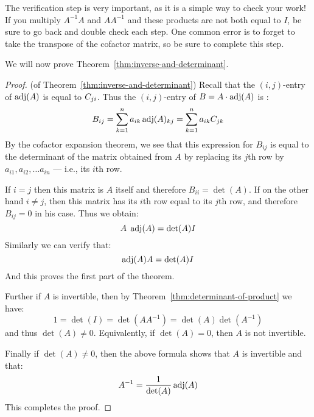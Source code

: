 The verification step is very important, as it is a simple way to
check your work! If you multiply $A^{-1}A$ and $AA^{-1}$ and these
products are not both equal to $I$, be sure to go back and double
check each step.  One common error is to forget to take the transpose
of the cofactor matrix, so be sure to complete this step.

We will now prove Theorem~\ref{thm:inverse-and-determinant}.

\begin{proof} (of Theorem~\ref{thm:inverse-and-determinant}) Recall
  that the $(i,j)$-entry of $\adj(A)$ is equal to $\cofactor{A}{ji}$.
  Thus the $(i,j)$-entry of $B=A\cdot \adj(A)$ is :
  \begin{equation*}
    B_{ij}=\sum_{k=1}^n a_{ik} \adj (A)_{kj}= \sum_{k=1}^n a_{ik} \cofactor{A}{jk}
  \end{equation*}
  By the cofactor expansion theorem, we see that this expression for
  $B_{ij}$ is equal to the determinant of the matrix obtained from $A$
  by replacing its $j$th row by $a_{i1}, a_{i2}, \dots a_{in}$ ---
  i.e., its $i$th row.

  If $i=j$ then this matrix is $A$ itself and therefore
  $B_{ii}=\det(A)$. If on the other hand $i\neq j$, then this matrix
  has its $i$th row equal to its $j$th row, and therefore $B_{ij}=0$
  in his case. Thus we obtain:
  \begin{equation*}
    A \; \adj(A) = {\det(A)} I
  \end{equation*}
  Similarly we can verify that:
  \begin{equation*}
    \adj(A)A = {\det(A)} I
  \end{equation*}
  And this proves the first part of the theorem. 

  Further if $A$ is invertible, then by
  Theorem~\ref{thm:determinant-of-product} we have:
  \begin{equation*}
    1 = \det(I) = \det(A A^{-1}) = \det(A) \det(A^{-1})
  \end{equation*}
  and thus $\det(A) \neq 0$. Equivalently, if $\det(A) = 0$, then
  $A$ is not invertible.

  Finally if $\det(A) \neq 0$, then the above formula shows that $A$
  is invertible and that:
  \begin{equation*}
    A^{-1} = \frac{1}{\det(A)} \adj(A)
  \end{equation*}
  This completes the proof.
\end{proof}



